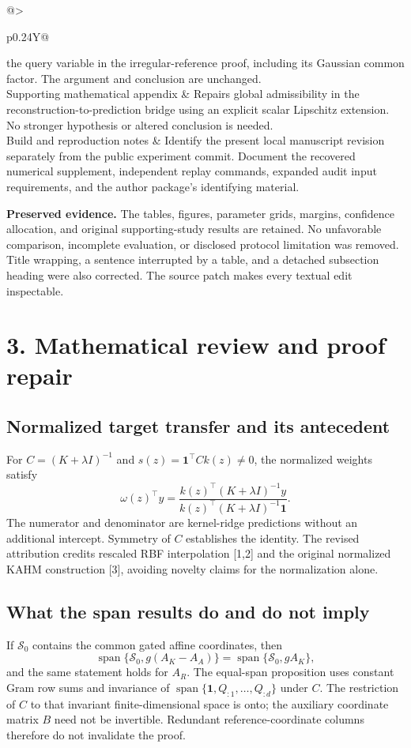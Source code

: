 \documentclass[11pt]{article}
\begin{document}
\begin{tabularx}{\linewidth}{@{}>{\raggedright\arraybackslash}p{0.24\linewidth}Y@{}}
the query variable in the irregular-reference proof, including its
Gaussian common factor. The argument and conclusion are unchanged. \\
Supporting mathematical appendix & Repairs global admissibility in the
reconstruction-to-prediction bridge using an explicit scalar Lipschitz
extension. No stronger hypothesis or altered conclusion is needed. \\
Build and reproduction notes & Identify the present local manuscript
revision separately from the public experiment commit. Document the
recovered numerical supplement, independent replay commands, expanded
audit input requirements, and the author package's identifying material. \\
\bottomrule
\end{tabularx}

\textbf{Preserved evidence.} The tables, figures, parameter grids, margins,
confidence allocation, and original supporting-study results are retained.
No unfavorable comparison, incomplete evaluation, or disclosed protocol
limitation was removed. Title wrapping, a sentence interrupted by a table,
and a detached subsection heading were also corrected. The source patch
makes every textual edit inspectable.

\newpage
\section*{3. Mathematical review and proof repair}

\subsection*{Normalized target transfer and its antecedent}
For $C=(K+\lambda I)^{-1}$ and $s(z)=\mathbf 1^\top Ck(z)\ne0$,
the normalized weights satisfy
\[
 \omega(z)^\top y
 =\frac{k(z)^\top(K+\lambda I)^{-1}y}
 {k(z)^\top(K+\lambda I)^{-1}\mathbf 1}.
\]
The numerator and denominator are kernel-ridge predictions without an
additional intercept. Symmetry of $C$ establishes the identity. The
revised attribution credits rescaled RBF interpolation [1,2] and the
original normalized KAHM construction [3], avoiding novelty claims for
the normalization alone.

\subsection*{What the span results do and do not imply}
If $\mathcal S_0$ contains the common gated affine coordinates, then
\[
 \operatorname{span}\{\mathcal S_0,g(A_K-A_A)\}
 =\operatorname{span}\{\mathcal S_0,gA_K\},
\]
and the same statement holds for $A_R$. The equal-span proposition uses
constant Gram row sums and invariance of
$\operatorname{span}\{\mathbf1,Q_{:1},\ldots,Q_{:d}\}$ under $C$.
The restriction of $C$ to that invariant finite-dimensional space is
onto; the auxiliary coordinate matrix $B$ need not be invertible.
Redundant reference-coordinate columns therefore do not invalidate the proof.
\end{document}
